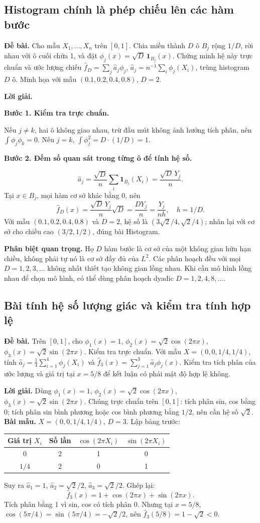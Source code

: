 \documentclass[11pt,a4paper]{article}
\newcommand{\buoc}[1]{\par\medskip\textbf{#1}\par}
\begin{document}
\subsection{Histogram chính là phép chiếu lên các hàm bước}
\textbf{Đề bài.} Cho mẫu $X_1,\ldots,X_n$ trên $[0,1]$.
Chia miền thành $D$ ô $B_j$ rộng $1/D$, rời nhau với ô cuối chứa 1,
và đặt $\phi_j(x)=\sqrt D\,\mathbf1_{B_j}(x)$.
Chứng minh hệ này trực chuẩn và ước lượng chiếu
$\widehat f_D=\sum_j\widehat a_j\phi_j$,
$\widehat a_j=n^{-1}\sum_i\phi_j(X_i)$, trùng histogram $D$ ô.
Minh họa với mẫu $(0.1,0.2,0.4,0.8)$, $D=2$.

\textbf{Lời giải.}
\buoc{Bước 1. Kiểm tra trực chuẩn.}
Nếu $j\ne k$, hai ô không giao nhau, trừ đầu mút không ảnh hưởng tích phân, nên $\int\phi_j\phi_k=0$. Nếu $j=k$, $\int\phi_j^2=D\cdot(1/D)=1$.
\buoc{Bước 2. Đếm số quan sát trong từng ô để tính hệ số.}
\[
\widehat a_j=\frac{\sqrt D}{n}\sum_i\mathbf1_{B_j}(X_i)=\frac{\sqrt D\,Y_j}{n}.
\]
Tại $x\in B_j$, mọi hàm cơ sở khác bằng 0, nên
\[
\boxed{\widehat f_D(x)=\frac{\sqrt D\,Y_j}{n}\sqrt D=\frac{DY_j}{n}
=\frac{Y_j}{nh},\quad h=1/D.}
\]
Với mẫu $(0.1,0.2,0.4,0.8)$ và $D=2$, hệ số là $(3\sqrt2/4,\sqrt2/4)$; nhân lại với cơ sở cho chiều cao $(3/2,1/2)$, đúng bài Histogram.

\textbf{Phân biệt quan trọng.} Họ $D$ hàm bước là cơ sở của một không gian hữu hạn chiều, không phải tự nó là cơ sở đầy đủ của $L^2$. Các phân hoạch đều với mọi $D=1,2,3,\ldots$ không nhất thiết tạo không gian lồng nhau. Khi cần mô hình lồng nhau để chọn mô hình, có thể dùng phân hoạch dyadic $D=1,2,4,8,\ldots$.

\subsection{Bài tính hệ số lượng giác và kiểm tra tính hợp lệ}
\textbf{Đề bài.} Trên $[0,1]$, cho
$\phi_1(x)=1$, $\phi_2(x)=\sqrt2\cos(2\pi x)$, $\phi_3(x)=\sqrt2\sin(2\pi x)$.
Kiểm tra trực chuẩn. Với mẫu $X=(0,0,1/4,1/4)$,
tính $\widehat a_j=\frac14\sum_{i=1}^4\phi_j(X_i)$ và
$\widehat f_3(x)=\sum_{j=1}^3\widehat a_j\phi_j(x)$.
Kiểm tra tích phân của ước lượng và giá trị tại $x=5/8$ để kết luận có phải mật độ hợp lệ không.

\textbf{Lời giải.}
Dùng $\phi_1(x)=1$, $\phi_2(x)=\sqrt2\cos(2\pi x)$, $\phi_3(x)=\sqrt2\sin(2\pi x)$. Chúng trực chuẩn trên $[0,1]$: tích phân sin, cos bằng 0; tích phân sin bình phương hoặc cos bình phương bằng $1/2$, nên cần hệ số $\sqrt2$.
\textbf{Bài mẫu.} $X=(0,0,1/4,1/4)$, $D=3$. Lập bảng trước:
\begin{center}
\begin{tabular}{cccc}
\toprule
Giá trị $X_i$ & Số lần & $\cos(2\pi X_i)$ & $\sin(2\pi X_i)$\\
\midrule
$0$&2&1&0\\
$1/4$&2&0&1\\
\bottomrule
\end{tabular}
\end{center}
Suy ra $\widehat a_1=1$, $\widehat a_2=\sqrt2/2$, $\widehat a_3=\sqrt2/2$. Ghép lại:
\[
\boxed{\widehat f_3(x)=1+\cos(2\pi x)+\sin(2\pi x).}
\]
Tích phân bằng 1 vì sin, cos có tích phân 0. Nhưng tại $x=5/8$, $\cos(5\pi/4)=\sin(5\pi/4)=-\sqrt2/2$, nên $\widehat f_3(5/8)=1-\sqrt2<0$.
\end{document}
